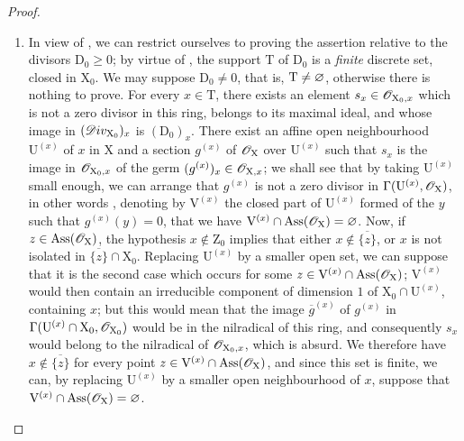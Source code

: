 \begin{proof}
\begin{enumerate}[label=(\roman*)]
  \item In view of , we can restrict ourselves to proving the assertion relative to the divisors $\mathrm{D}_0\geq0$;
by virtue of , the support $\mathrm{T}$ of $\mathrm{D}_0$ is a \emph{finite} discrete set, closed in $\mathrm{X}_0$.
We may suppose $\mathrm{D}_0\neq0$, that is, $\mathrm{T}\neq\varnothing$, otherwise there is nothing to prove.
For every $x\in\mathrm{T}$, there exists an element $s_x\in\mathscr{O}_{\mathrm{X}_0,x}$ which is not a zero divisor in this ring, belongs to its maximal ideal, and whose image in $(\mathscr{D}iv_{\mathrm{X}_0})_x$ is $(\mathrm{D}_0)_x$.
There exist an affine open neighbourhood $\mathrm{U}^{(x)}$ of $x$ in $\mathrm{X}$ and a section $g^{(x)}$ of $\mathscr{O}_\mathrm{X}$ over $\mathrm{U}^{(x)}$ such that $s_x$ is the image in $\mathscr{O}_{\mathrm{X}_0,x}$ of the germ $(g^{(x)})_x\in\mathscr{O}_{\mathrm{X},x}$;
we shall see that by taking $\mathrm{U}^{(x)}$ small enough, we can arrange that $g^{(x)}$ is not a zero divisor in $\Gamma(\mathrm{U}^{(x)},\mathscr{O}_\mathrm{X})$, in other words , denoting by $\mathrm{V}^{(x)}$ the closed part of $\mathrm{U}^{(x)}$ formed of the $y$ such that $g^{(x)}(y)=0$, that we have $\mathrm{V}^{(x)}\cap\operatorname{Ass}(\mathscr{O}_\mathrm{X})=\varnothing$.
Now, if $z\in\operatorname{Ass}(\mathscr{O}_\mathrm{X})$, the hypothesis $x\notin\mathrm{Z}_0$ implies that either $x\notin\overline{\{z\}}$, or $x$ is not isolated in $\overline{\{z\}}\cap\mathrm{X}_0$.
Replacing $\mathrm{U}^{(x)}$ by a smaller open set, we can suppose that it is the second case which occurs for some $z\in\mathrm{V}^{(x)}\cap\operatorname{Ass}(\mathscr{O}_\mathrm{X})$;
$\mathrm{V}^{(x)}$ would then contain an irreducible component of dimension $1$ of $\mathrm{X}_0\cap\mathrm{U}^{(x)}$, containing $x$;
but this would mean that the image $\overline{g}^{(x)}$ of $g^{(x)}$ in $\Gamma(\mathrm{U}^{(x)}\cap\mathrm{X}_0,\mathscr{O}_{\mathrm{X}_0})$ would be in the nilradical of this ring, and consequently $s_x$ would belong to the nilradical of $\mathscr{O}_{\mathrm{X}_0,x}$, which is absurd.
We therefore have $x\notin\overline{\{z\}}$ for every point $z\in\mathrm{V}^{(x)}\cap\operatorname{Ass}(\mathscr{O}_\mathrm{X})$, and since this set is finite, we can, by replacing $\mathrm{U}^{(x)}$ by a smaller open neighbourhood of $x$, suppose that $\mathrm{V}^{(x)}\cap\operatorname{Ass}(\mathscr{O}_\mathrm{X})=\varnothing$.


\end{enumerate}
\end{proof}
